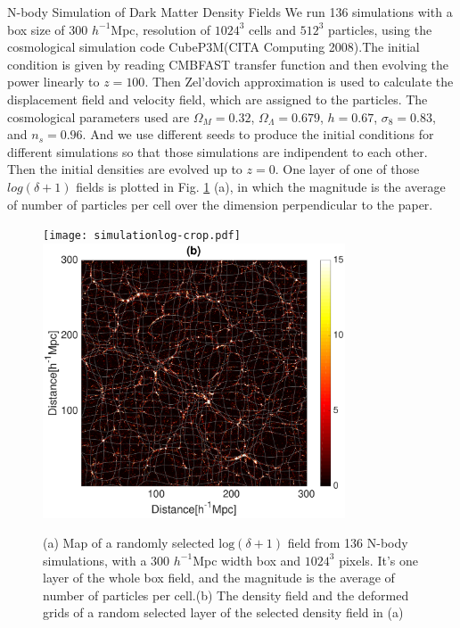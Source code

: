 \begin{section}{N-body Simulation of Dark Matter Density Fields}
  \label{sec:simulation}
    We run 136 simulations with a box size of 300 $h^{-1}$Mpc, resolution of $1024^3$ cells and $512^3$ particles, using the cosmological simulation code CubeP3M(CITA Computing 2008).The initial condition is given by reading CMBFAST transfer function and then evolving the power linearly to $z=100$. Then Zel'dovich approximation is used to calculate the displacement field and velocity field, which are assigned to the particles. The cosmological parameters used are $\Omega_M=0.32$, $\Omega_{\Lambda}=0.679$, $h=0.67$, $\sigma_8=0.83$, and $n_s=0.96$. And we use different seeds to produce the initial conditions for different simulations so that those simulations are indipendent to each other. Then the initial densities are evolved up to $z=0$. One layer of one of those $log(\delta+1)$ fields is plotted in Fig. \ref{fig:simandrec} (a), in which the magnitude is the average of number of particles per cell over the dimension perpendicular to the paper.
\begin{figure}
\centering
 \texttt{[image: simulationlog-crop.pdf]}
 \includegraphics[width=0.8\textwidth]{reconstruction-crop.pdf}
 \label{fig:simandrec}
   \caption{(a) Map of a randomly selected $\mathrm{log}(\delta +1)$ field from 136 N-body simulations, with a 300 $h^{-1}$Mpc width box and $1024^3$ pixels. It's one layer of the whole box field, and the magnitude is the average of number of particles per cell.(b) The density field and the deformed grids of a random selected layer of the selected density field in (a)}
\end{figure}

\end{section}

